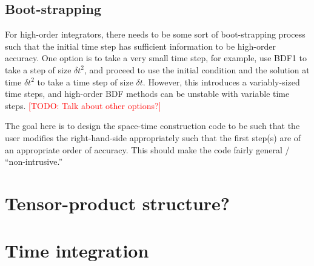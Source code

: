 \documentclass[a4paper,12pt]{article}
\makeatletter
\newcommand{\todo}[1]{\textcolor{red}{[TODO\@: #1]}}
\makeatother
\begin{document}
\subsection{Boot-strapping}

For high-order integrators, there needs to be some sort of boot-strapping process such that the initial time step has sufficient
information to be high-order accuracy. One option is to take a very small time step, for example, use BDF1 to take a step of
size $\delta t^2$, and proceed to use the initial condition and the solution at time $\delta t^2$ to take a time step of size 
$\delta t$. However, this introduces a variably-sized time steps, and high-order BDF methods can be unstable with variable
time steps. \todo{Talk about other options?}

The goal here is to design the space-time construction code to be such that the user modifies the right-hand-side appropriately
such that the first step(s) are of an appropriate order of accuracy. This should make the code fairly general / ``non-intrusive.'' 

\section{Tensor-product structure?}


\newpage
\section{Time integration}
\end{document}
